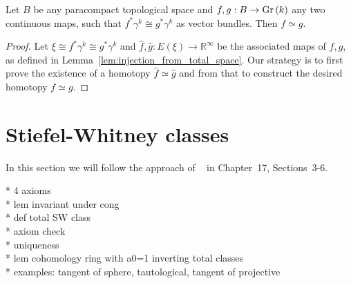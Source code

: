 \begin{theorem} Let $B$ be any paracompact topological space and $f,g:B\to\Gr{k}$ any two continuous maps, such that $f^*\gamma^k\cong g^*\gamma^k$ as vector bundles. Then $f\simeq g$.
\end{theorem}
\begin{proof} Let $\xi\cong f^*\gamma^k\cong g^*\gamma^k$ and $\hat{f},\hat{g}:E(\xi)\to\mathbb{R}^{\infty}$ be the associated maps of $f,g$, as defined in Lemma~\ref{lem:injection_from_total_space}. Our strategy is to first prove the existence of a homotopy $\hat{f}\simeq\hat{g}$ and from that to construct the desired homotopy $f\simeq g$.


\end{proof}

\section{Stiefel-Whitney classes}
In this section we will follow the approach of ~\cite{husemoller} in Chapter~17, Sections~3-6.


* 4 axioms\\
* lem invariant under cong\\
* def total SW class\\
* axiom check\\
* uniqueness\\
* lem cohomology ring with a0=1 inverting total classes\\
* examples: tangent of sphere, tautological, tangent of projective




